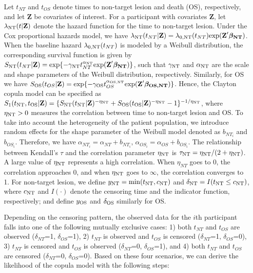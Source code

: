 Let $t_{NT}$ and $t_{OS}$ denote times to non-target lesion and death (OS), respectively, and let $\textbf{Z}$ be covariates of interest.
For a participant with covariates $\textbf{Z}$, let $\lambda_{\rm NT}(t|\textbf{Z})$
denote the hazard function for the time to non-target lesion. Under the Cox
proportional hazards model, we have $\lambda_{\rm NT}(t_{NT}|\textbf{Z})=\lambda_{0, \rm NT}(t_{NT})\mathrm{exp}(\textbf{Z}' \boldsymbol{\beta_{\rm NT}})$.
When the baseline hazard $\lambda_{0, \rm NT}(t_{NT})$ is modeled by a Weibull
distribution, the corresponding survival function is given by
$S_{\rm NT}(t_{NT}|\textbf{Z})=\mathrm{exp}\{-\gamma_{\rm NT} t_{NT}^{\alpha_{\rm NT}}
\mathrm{exp}(\textbf{Z}' \boldsymbol{\beta_{\rm NT}} )\}$, such that $\gamma_{\rm NT}$ and $\alpha_{\rm NT}$ are the scale and shape parameters
of the Weibull distribution, respectively. Similarly, for \ac{OS} we have $S_{\rm OS}(t_{OS}|\textbf{Z})=\mathrm{exp}\{-\gamma_{\rm OS} t_{OS}^{\alpha_{\rm OS,NT}}
\mathrm{exp}(\textbf{Z}' \boldsymbol{\beta_{\rm OS,NT}} )\}$. Hence, the Clayton copula model can be specified as $S_1(t_{\rm NT},
t_{\rm OS}|\textbf{Z})=\{S_{\rm NT}(t_{\rm NT}|\textbf{Z})^{-\eta_{\rm NT}}
+S_{\rm OS}(t_{\rm OS}|\textbf{Z})^{-\eta_{\rm NT}}-1\}^{-1/\eta_{\rm NT}}$, 
where $\eta_{\rm NT}>0$ measures the correlation between time to non-target lesion and OS. To take into account the heterogeneity of the patient population, we introduce random effects for the shape parameter of the Weibull model denoted as $b_{NT_i}$ and $b_{OS_i}$. Therefore, we have $\alpha_{NT_i}=\alpha_{NT} + b_{NT_i}$, $\alpha_{OS_i}=\alpha_{OS}+b_{OS_i}$. The relationship between Kendall's $\tau$ and the correlation parameter $\eta_{\rm NT}$
is $\tau_{\rm NT} = \eta_{\rm NT}/(2+\eta_{\rm NT})$. A large value of $\eta_{\rm NT}$
represents a high correlation. When $\eta_{NT}$ goes to 0,
the correlation approaches 0, and when $\eta_{\rm NT}$ goes to $\infty$, the correlation converges to 1. 
For non-target lesion, we define $y_{\rm NT}=\mathrm{min}(t_{\rm NT}, c_{\rm NT})$ and
$\delta_{\rm NT}=I(t_{\rm NT} \le c_{\rm NT})$,
where $c_{\rm NT}$ and $I(\cdot)$ denote the censoring time and the indicator function,
respectively; and define $y_{\rm OS}$ and $\delta_{\rm OS}$ similarly for OS.

Depending on the censoring pattern, the observed data for the $i$th participant falls into one of the following mutually exclusive cases: 1) both $t_{NT}$ and $t_{OS}$ are observed ($\delta_{NT}$=1, $\delta_{OS}$=1), 2) $t_{NT}$ is observed and $t_{OS}$ is censored ($\delta_{NT}$=1, $\delta_{OS}$=0), 3) $t_{NT}$ is censored and $t_{OS}$ is observed ($\delta_{NT}$=0, $\delta_{OS}$=1), and 4) both $t_{NT}$ and $t_{OS}$ are censored ($\delta_{NT}$=0, $\delta_{OS}$=0). Based on these four scenarios, we can derive the likelihood of the copula model with the following steps:

